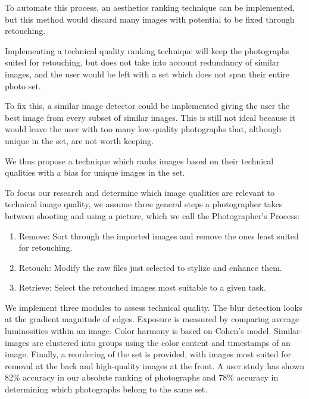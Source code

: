 \documentclass{article}
\begin{document}
To automate this process, an aesthetics ranking technique can be implemented, but this method would discard many images with potential to be fixed through retouching.


Implementing a technical quality ranking technique will keep the photographs suited for retouching, but does not take into account redundancy of similar images, and the user would be left with a set which does not span their entire photo set.

To fix this, a similar image detector could be implemented giving the user the best image from every subset of similar images. This is still not ideal because it would leave the user with too many low-quality photographs that, although unique in the set, are not worth keeping.

We thus propose a technique which ranks images based on their technical qualities with a bias for unique images in the set.

To focus our research and determine which image qualities are relevant to technical image quality, we assume three general steps a photographer takes between shooting and using a picture, which we call the Photographer's Process:
\begin{enumerate}
\item Remove: Sort through the imported images and remove the ones least suited for retouching.
\item Retouch: Modify the raw files just selected to stylize and enhance them.
\item Retrieve: Select the retouched images most suitable to a given task.
\end{enumerate}

We implement three modules to assess technical quality. The blur detection looks at the gradient magnitude of edges. Exposure is measured by comparing average luminosities within an image. Color harmony is based on Cohen's model\cite{Cohen-Or:2006:CH:1179352.1141933}. Similar-images are clustered into groups using the color content and timestamps of an image. Finally, a reordering of the set is provided, with images most suited for removal at the back and high-quality images at the front. A user study has shown 82\% accuracy in our absolute ranking of photographs and 78\% accuracy in determining which photographs belong to the same set.
\end{document}
